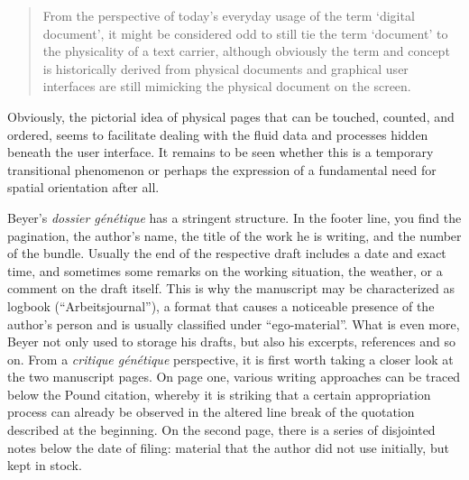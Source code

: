 \begin{paper}
\begin{quote}
From the perspective of today's everyday usage of the term `digital
document', it might be considered odd to still tie the term `document'
to the physicality of a text carrier, although obviously the term and
concept is historically derived from physical documents and graphical
user interfaces are still mimicking the physical document on the screen.
\begin{flushright}
    \parencite[146]{ries_philology_2017}
\end{flushright} 
\end{quote}

Obviously, the pictorial idea of physical pages that can be touched,
counted, and ordered, seems to facilitate dealing with the fluid data and
processes hidden beneath the user interface. It remains to be seen
whether this is a temporary transitional phenomenon or perhaps the
expression of a fundamental need for spatial orientation after all.

Beyer's \emph{dossier génétique} has a stringent structure. In the
footer line, you find the pagination, the author's name, the title of
the work he is writing, and the number of the bundle. Usually the
end of the respective draft includes a date and exact time, and
sometimes some remarks on the working situation, the weather, or a
comment on the draft itself. This is why the manuscript may be
characterized as logbook (``Arbeitsjournal''), a format that causes a
noticeable presence of the author's person and is usually classified
under ``ego-material''. What is even more, Beyer not only used to storage his drafts, but also his excerpts, references and so on. From a
\emph{critique génétique} perspective, it is first worth taking a closer
look at the two manuscript pages. On page one, various writing
approaches can be traced below the Pound citation, whereby it is
striking that a certain appropriation process can already be observed in
the altered line break of the quotation described at the beginning. On
the second page, there is a series of disjointed notes below the date of
filing: material that the author did not use initially, but kept in
stock.


\end{paper}
